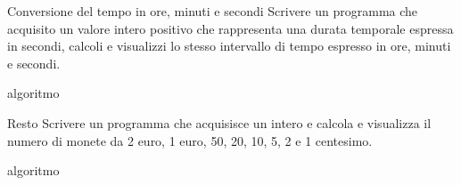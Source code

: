 \begin{labex}{Conversione del tempo in ore, minuti e secondi}
Scrivere un programma che acquisito un valore intero positivo che rappresenta una durata temporale espressa in secondi, calcoli e visualizzi lo stesso intervallo di tempo espresso in ore, minuti e secondi.

\begin{tags}
algoritmo
\end{tags}

\begin{labexinout}
\end{labexinout}

\begin{labexcases}


\end{labexcases}



\end{labex}


\begin{labex}{Resto}
Scrivere un programma che acquisisce un intero e calcola e visualizza il numero di monete da 2 euro, 1 euro, 50, 20, 10, 5, 2 e 1 centesimo.

\begin{tags}
algoritmo
\end{tags}

\begin{labexinout}
\end{labexinout}

\begin{labexcases}


\end{labexcases}



\end{labex}
